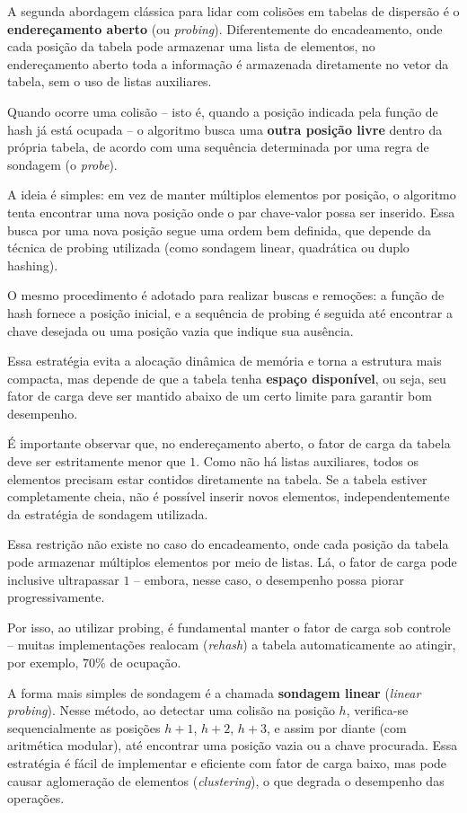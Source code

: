 A segunda abordagem clássica para lidar com colisões em tabelas de dispersão é o \textbf{endereçamento aberto} (ou \textit{probing}). 
Diferentemente do encadeamento, onde cada posição da tabela pode armazenar uma lista de elementos, no endereçamento aberto toda a informação é armazenada diretamente no vetor da tabela, sem o uso de listas auxiliares.

Quando ocorre uma colisão -- isto é, quando a posição indicada pela função de hash já está ocupada -- o algoritmo busca uma \textbf{outra posição livre} dentro da própria tabela, de acordo com uma sequência determinada por uma regra de sondagem (o \textit{probe}).

A ideia é simples: em vez de manter múltiplos elementos por posição, o algoritmo tenta encontrar uma nova posição onde o par chave-valor possa ser inserido. 
Essa busca por uma nova posição segue uma ordem bem definida, que depende da técnica de probing utilizada (como sondagem linear, quadrática ou duplo hashing).

O mesmo procedimento é adotado para realizar buscas e remoções: a função de hash fornece a posição inicial, e a sequência de probing é seguida até encontrar a chave desejada ou uma posição vazia que indique sua ausência.

Essa estratégia evita a alocação dinâmica de memória e torna a estrutura mais compacta, mas depende de que a tabela tenha \textbf{espaço disponível}, ou seja, seu fator de carga deve ser mantido abaixo de um certo limite para garantir bom desempenho.

É importante observar que, no endereçamento aberto, o fator de carga da tabela deve ser estritamente menor que $1$. 
Como não há listas auxiliares, todos os elementos precisam estar contidos diretamente na tabela. 
Se a tabela estiver completamente cheia, não é possível inserir novos elementos, independentemente da estratégia de sondagem utilizada.

Essa restrição não existe no caso do encadeamento, onde cada posição da tabela pode armazenar múltiplos elementos por meio de listas. 
Lá, o fator de carga pode inclusive ultrapassar $1$ -- embora, nesse caso, o desempenho possa piorar progressivamente.

Por isso, ao utilizar probing, é fundamental manter o fator de carga sob controle -- muitas implementações realocam ({\em rehash}) a tabela automaticamente ao atingir, por exemplo, $70\%$ de ocupação.

A forma mais simples de sondagem é a chamada \textbf{sondagem linear} (\textit{linear probing}). 
Nesse método, ao detectar uma colisão na posição $h$, verifica-se sequencialmente as posições $h+1$, $h+2$, $h+3$, e assim por diante (com aritmética modular), até encontrar uma posição vazia ou a chave procurada. 
Essa estratégia é fácil de implementar e eficiente com fator de carga baixo, mas pode causar aglomeração de elementos (\textit{clustering}), o que degrada o desempenho das operações.

